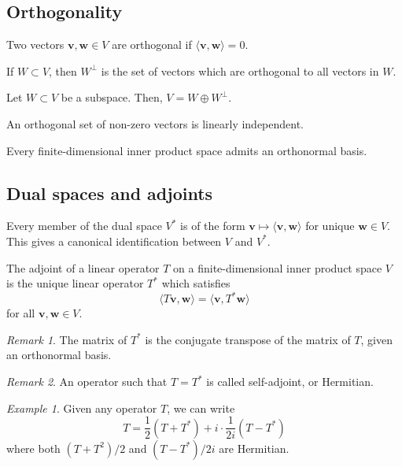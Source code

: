 \documentclass[11pt]{article}
\renewcommand{\vec}[1]{\boldsymbol{#1}}
\newcommand{\vv}{\vec{v}}
\newcommand{\vw}{\vec{w}}
\newcommand{\ip}[2]{\langle #1, #2 \rangle}
\theoremstyle{definition}
\theoremstyle{remark}
\newtheorem*{remark}{Remark}
\newtheorem*{example}{Example}
\numberwithin{equation}{section}
\begin{document}
    \subsection{Orthogonality}
    \begin{definition}
        Two vectors $\vv, \vw \in V$ are orthogonal if $\ip{\vv}{\vw} = 0$.
    \end{definition}

    \begin{definition}
        If $W \subset V$, then $W^\perp$ is the set of vectors which are orthogonal to
        all vectors in $W$.
    \end{definition}

    \begin{lemma}
        Let $W\subset V$ be a subspace. Then, $V = W \oplus W^\perp$.
    \end{lemma}

    \begin{theorem}
        An orthogonal set of non-zero vectors is linearly independent.
    \end{theorem}

    \begin{theorem}
        Every finite-dimensional inner product space admits an orthonormal basis.
    \end{theorem}


    \subsection{Dual spaces and adjoints}
    
    \begin{lemma}
        Every member of the dual space $V^*$ is of the form $\vv \mapsto
        \ip{\vv}{\vw}$ for unique $\vw \in V$. This gives a canonical identification
        between $V$ and $V^*$.
    \end{lemma}

    \begin{definition}
        The adjoint of a linear operator $T$ on a finite-dimensional inner product
        space $V$ is the unique linear operator $T^*$ which satisfies \[
            \ip{T\vv}{\vw} = \ip{\vv}{T^*\vw}
        \] for all $\vv, \vw \in V$.
        \begin{remark}
            The matrix of $T^*$ is the conjugate transpose of the matrix of $T$,
            given an orthonormal basis.
        \end{remark}
        \begin{remark}
            An operator such that $T = T^*$ is called self-adjoint, or Hermitian.
        \end{remark}
    \end{definition}
    \begin{example}
        Given any operator $T$, we can write \[
            T = \frac{1}{2}(T + T^*) + i\cdot\frac{1}{2i}(T - T^*)
        \] where both $(T + T^2) / 2$ and $(T - T^*) / 2i$ are Hermitian.
    \end{example}
    
\end{document}
